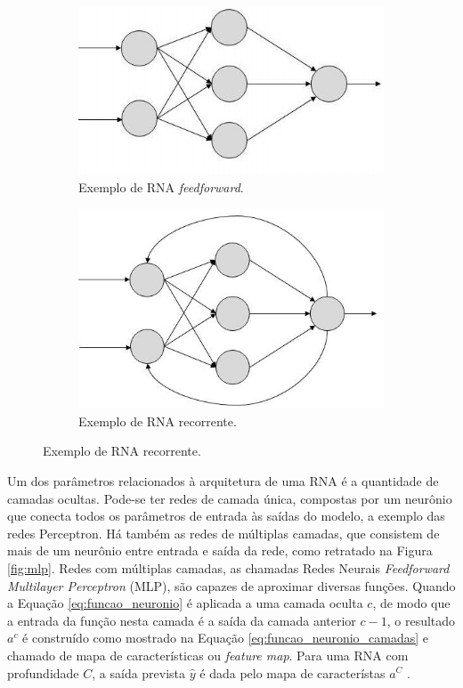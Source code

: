 \begin{figure}[h!]
	\caption{Exemplos de RNA com diferentes tipos de conexões entre neurônios \cite{rna:feedback}.}
	\label{fig:rna_conectividade}
	\begin{subfigure}[h]{0.35\linewidth}
		\caption{Exemplo de RNA \emph{feedforward}.}
		\label{fig:feedforward}
		\includegraphics[width=\linewidth]{img/feedforward.jpg}
	\end{subfigure}
	\hfill
	\begin{subfigure}[h]{0.35\linewidth}
		\caption{Exemplo de RNA recorrente.}
		\label{fig:recorrente}
		\includegraphics[width=\linewidth]{img/recorrente2}
	\end{subfigure}%
\end{figure}

Um dos parâmetros relacionados à arquitetura de uma RNA é a quantidade de camadas ocultas. Pode-se ter redes de camada única, compostas por um neurônio que conecta todos os parâmetros de entrada às saídas do modelo, a exemplo das redes Perceptron. Há também as redes de múltiplas camadas, que consistem de mais de um neurônio entre entrada e saída da rede, como retratado na Figura \ref{fig:mlp}. Redes com múltiplas camadas, as chamadas Redes Neurais \emph{Feedforward Multilayer Perceptron} (MLP), são capazes de aproximar diversas funções. Quando a Equação \ref{eq:funcao_neuronio} é aplicada a uma camada oculta $c$, de modo que a entrada da função nesta camada é a saída da camada anterior $c-1$, o resultado $a^{c}$ é construído como mostrado na Equação \ref{eq:funcao_neuronio_camadas} e chamado de mapa de características ou \emph{feature map}. Para uma RNA com profundidade $C$, a saída prevista $\hat{y}$
é dada pelo mapa de característas $a^C$ \cite{hornik1991approximation,Teresa:Livro}.

